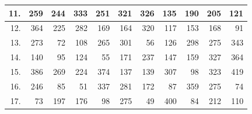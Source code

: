 \begin{table}[H]
{\begin{tabular}{|r|r|r|r|r|r|r|r|r|r|r|}
11.                    & 259                            & 244                             & 333                              & 251                              & 321                              & 326                              & 135                              & 190                              & 205                              & 121                              \\ \hline
12.                    & 364                            & 225                             & 282                              & 169                              & 164                              & 320                              & 117                              & 153                              & 168                              & 91                               \\ \hline
13.                    & 273                            & 72                              & 108                              & 265                              & 301                              & 56                               & 126                              & 298                              & 275                              & 343                              \\ \hline
14.                    & 140                            & 95                              & 124                              & 55                               & 171                              & 237                              & 147                              & 159                              & 327                              & 364                              \\ \hline
15.                    & 386                            & 269                             & 224                              & 374                              & 137                              & 139                              & 307                              & 98                               & 323                              & 419                              \\ \hline
16.                    & 246                            & 85                              & 51                               & 337                              & 281                              & 172                              & 87                               & 359                              & 275                              & 74                               \\ \hline
17.                    & 73                             & 197                             & 176                              & 98                               & 275                              & 49                               & 400                              & 84                               & 212                              & 110                              \\ \hline

\end{tabular}}
\end{table}
